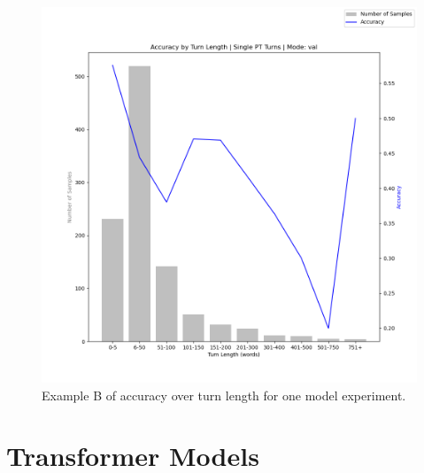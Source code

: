 \documentclass[12pt]{report}
\begin{document}
\begin{figure}
    \includegraphics[width=\textwidth]{figures/accuracy_by_length_2024.03.14_09.59.35_model_11_val.png}
    \caption{Example B of accuracy over turn length for one model experiment.}
    \label{fig: acc over turn len 11}
\end{figure}

\chapter{Transformer Models}
\label{App: transformers}
\end{document}
